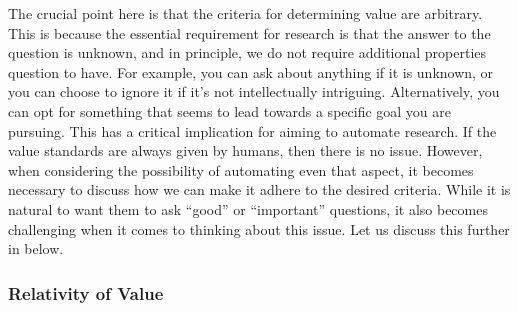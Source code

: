 The crucial point here is that the criteria for determining value are arbitrary. This is because the essential requirement for research is that the answer to the question is unknown, and in principle, we do not require additional properties question to have. For example, you can ask about anything if it is unknown, or you can choose to ignore it if it's not intellectually intriguing. Alternatively, you can opt for something that seems to lead towards a specific goal you are pursuing. This has a critical implication for aiming to automate research. If the value standards are always given by humans, then there is no issue. However, when considering the possibility of automating even that aspect, it becomes necessary to discuss how we can make it adhere to the desired criteria. While it is natural to want them to ask ``good'' or ``important'' questions, it also becomes challenging when it comes to thinking about this issue. Let us discuss this further in below.

\subsubsection{Relativity of Value}

